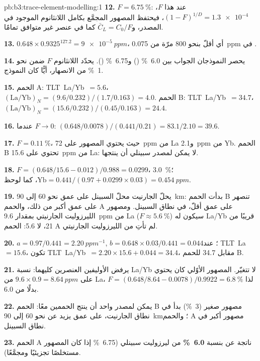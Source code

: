 \begin{solution}{pb:b3:trace-element-modelling:1}
\textbf{12.} $F = \qty{6.75}{\percent}$: عند هذا $F$، $(1 - F)^{1/D} =
\num{1.3e-4}$، فيحتفظ المصهور المجمَّع بكامل اللانثانوم الموجود في المصدر،
و$\bar C_L = C_0/F$ كما في عنصر غير متوافق تمامًا.

\textbf{13.} $0.648\times0.9325^{127.2} = \qty{9e-5}{ppm}$، أي أقلّ بنحو 800 مرّة
من \qty{0.075}{ppm} في .

\textbf{14.} يحصر النموذجان الجواب بين \qty{6.0}{\percent} ()
و\qty{6.75}{\percent} (). يحدّد اللانثانوم $F$ ضمن
نحو \qty{1}{\percent} من الانصهار، أيًّا كان النموذج.

\textbf{15.} الحمم A: \mbox{\textdir TLT La/Yb $= 5.6$}، $(\mathrm{La}/\mathrm{Yb})_N =
(9.6/0.232)/(1.7/0.163) = 4.0$. الحمم B: \mbox{\textdir TLT La/Yb $= 34.7$}، $(\mathrm{La}/\mathrm{Yb})_N
= (15.6/0.232)/(0.45/0.163) = 24.4$.

\textbf{16.} عندما $F \to 0$: $(0.648/0.0078)/(0.441/0.21) = 83.1/2.10 = 39.6$.

\textbf{17.} $F = \qty{0.11}{\percent}$، حيث يحتوي المصهور على
\qty{72}{ppm} من La و\qty{2.1}{ppm} من Yb. الحمم B تحتوي على \qty{15.6}{ppm} من La:
لا يمكن لمصدر سبينلي أن ينتجها.

\textbf{18.} $F = (0.648/15.6 - 0.012)/0.988 = 0.0299$، \qty{3.0}{\percent}؛
$\mathrm{Yb} = 0.441/(0.97 + 0.0299\times0.03) = \qty{0.454}{ppm}$، كما
لوحظ.

\textbf{19.} يحلّ الجارنيت محلّ السبينل على عمق نحو 60 إلى \qty{90}{km}: بدأت الحمم B
تنصهر على عمق أكبر من ذلك، والحمم A على عمق أقلّ، في نطاق السبينل. ومصهور الليرزوليت الجارنيتي
بمقدار \qty{9.6}{ppm} من La ($F \approx \qty{5.6}{\percent}$) سيكون له La/Yb
قريبًا من 21، لا 5.6: الحمم A لم تأتِ من الليرزوليت الجارنيتي.

\textbf{20.} $a = 0.97/0.441 = \qty{2.20}{ppm^{-1}}$, $b = 0.648\times0.03/0.441
= 0.044$؛ عند \mbox{\textdir TLT La $= 15.6$}، تكون \mbox{\textdir TLT La/Yb $= 2.20\times15.6 + 0.044 = 34.4$}، مقابل
34.7 للحمم B.

\textbf{21.} يرفض الأوليفين العنصرين كليهما: نسبة La/Yb لا تتغيّر. المصهور الأوّلي
كان يحتوي على $9.6\times0.9 = \qty{8.64}{ppm}$ من La، لذا $F = (0.648/8.64 -
0.0078)/0.9922 = \qty{6.8}{\percent}$ بدلًا من 6.0.

\textbf{22.} يمكن لمصدر واحد أن ينتج الحممين معًا: الحمم B مصهور صغير
(\qty{3}{\percent}) بدأ في نطاق الجارنيت، على عمق يزيد عن نحو 60 إلى
\qty{90}{km}؛ والحمم A مصهور أكبر في نطاق السبينل.

\textbf{23.} الحمم A ناتجة عن  بنسبة \textbf{\qty[text-series-to-math=true]{6.0}{\percent}}
من ليرزوليت سبينلي (\qty{6.75}{\percent} إذا كان المصهور
مستخلصًا تجزيئيًا ومجمَّعًا).
\end{solution}

